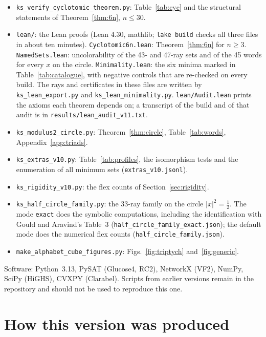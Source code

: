 \begin{itemize}
certifier with the two reductions of Section~\ref{sec:methods}, which the mode \texttt{one4} of
\texttt{ks\_conjugate\_closed\_theorem.py} also uses.
\item \texttt{ks\_verify\_cyclotomic\_theorem.py}: Table~\ref{tab:cyc} and the structural
statements of Theorem~\ref{thm:6n}, $n\le30$.
\item \texttt{lean/}: the Lean proofs (Lean 4.30, mathlib; \texttt{lake build} checks all
three files in about ten minutes).  \texttt{Cyclotomic6n.lean}: Theorem~\ref{thm:6n} for
$n\ge3$.  \texttt{NamedSets.lean}: uncolorability of the 43- and 47-ray sets and of the 45
words for every $x$ on the circle.  \texttt{Minimality.lean}: the six minima marked in
Table~\ref{tab:catalogue}, with negative controls that are re-checked on every build.  The rays
and certificates in these files are written by \texttt{ks\_lean\_export.py} and
\texttt{ks\_lean\_minimality.py}.  \texttt{lean/Audit.lean} prints the axioms each theorem
depends on; a transcript of the build and of that audit is in
\texttt{results/lean\_audit\_v11.txt}.
\item \texttt{ks\_modulus2\_circle.py}: Theorem~\ref{thm:circle}, Table~\ref{tab:words},
Appendix~\ref{app:triads}.
\item \texttt{ks\_extras\_v10.py}: Table~\ref{tab:profiles}, the isomorphism tests and the
enumeration of all minimum sets (\texttt{extras\_v10.jsonl}).
\item \texttt{ks\_rigidity\_v10.py}: the flex counts of Section~\ref{sec:rigidity}.
\item \texttt{ks\_half\_circle\_family.py}: the 33-ray family on the circle
$|x|^2=\tfrac12$.  The mode \texttt{exact} does the symbolic computations, including the
identification with Gould and Aravind's Table~3 (\texttt{half\_circle\_family\_exact.json}); the
default mode does the numerical flex counts (\texttt{half\_circle\_family.json}).
\item \texttt{make\_alphabet\_cube\_figures.py}: Figs.~\ref{fig:triptych} and~\ref{fig:generic}.
\end{itemize}

Software: Python~3.13, PySAT (Glucose4, RC2), NetworkX (VF2), NumPy, SciPy (HiGHS), CVXPY
(Clarabel).  Scripts from earlier versions remain in the repository and should not be used to
reproduce this one.

\section{How this version was produced}\label{app:produced}

